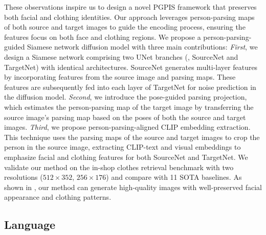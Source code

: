 These observations inspire us to design a novel PGPIS framework that preserves both facial and clothing identities. Our approach leverages person-parsing maps of both source and target images to guide the encoding process, ensuring the features focus on both face and clothing regions.
%
We propose a person-parsing-guided Siamese network diffusion model with three main contributions: \textit{First}, we design a Siamese network comprising two UNet branches (\ie, SourceNet and TargetNet) with identical architectures. SourceNet generates multi-layer features by incorporating features from the source image and parsing maps. These features are subsequently fed into each layer of TargetNet for noise prediction in the diffusion model.
%
\textit{Second}, we introduce the pose-guided parsing projection, which estimates the person-parsing map of the target image by transferring the source image’s parsing map based on the poses of both the source and target images.
%
\textit{Third}, we propose person-parsing-aligned CLIP embedding extraction. This technique uses the parsing maps of the source and target images to crop the person in the source image, extracting CLIP-text and visual embeddings to emphasize facial and clothing features for both SourceNet and TargetNet.
%
We validate our method on the in-shop clothes retrieval benchmark with two resolutions ($512\times352$, $256\times176$) and compare with 11 SOTA baselines.
%
As shown in , our method can generate high-quality images with well-preserved facial appearance and clothing patterns.
\subsection{Language}
%
